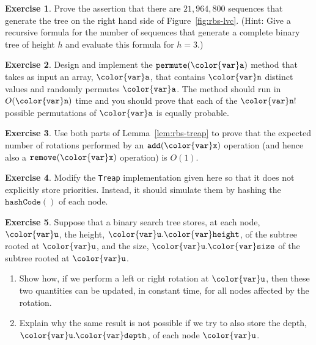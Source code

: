 \documentclass[10pt]{book}
\newcommand{\figref}[1]{Figure~\ref{fig:#1}}
\theoremstyle{plain}
\newcommand{\lemref}[1]{Lemma~\ref{lem:#1}}
\theoremstyle{definition}
\newtheorem{exc}{Exercise}[chapter]
\newcommand{\exclabel}[1]{\label{exc:#1}}
\begin{document}
\begin{exc}
  Prove the assertion that there are $21,964,800$ sequences that generate
  the tree on the right hand side of \figref{rbs-lvc}.  (Hint: Give a
  recursive formula for the number of sequences that generate a complete
  binary tree of height $h$ and evaluate this formula for $h=3$.)
\end{exc}

\begin{exc}
  Design and implement the \ensuremath{\mathtt{permute({\color{var}a})}} method that takes as input an
  array, \ensuremath{\mathtt{{\color{var}a}}}, that contains \ensuremath{\mathtt{{\color{var}n}}} distinct values and randomly permutes \ensuremath{\mathtt{{\color{var}a}}}.
  The method should run in $O(\ensuremath{\mathtt{{\color{var}n}}})$ time and you should prove that each
  of the $\ensuremath{\mathtt{{\color{var}n}}}!$ possible permutations of \ensuremath{\mathtt{{\color{var}a}}} is equally probable. 
\end{exc}

\begin{exc}\exclabel{treap-rotates}
  Use both parts of \lemref{rbs-treap} to prove that the expected number
  of rotations performed by an \ensuremath{\mathtt{add({\color{var}x})}} operation (and hence also a
  \ensuremath{\mathtt{remove({\color{var}x})}} operation) is $O(1)$.
\end{exc}

\begin{exc}
  Modify the \texttt{Treap} implementation given here so that it does not
  explicitly store priorities.  Instead, it should simulate them by
  hashing the \ensuremath{\mathtt{hashCode()}} of each node.
\end{exc}

\begin{exc}
  Suppose that a binary search tree stores, at each node, \ensuremath{\mathtt{{\color{var}u}}}, the height,
  \ensuremath{\mathtt{{\color{var}u}.{\color{var}height}}}, of the subtree rooted at \ensuremath{\mathtt{{\color{var}u}}}, and the size, \ensuremath{\mathtt{{\color{var}u}.{\color{var}size}}} of
  the subtree rooted at \ensuremath{\mathtt{{\color{var}u}}}. 
  \begin{enumerate}
    \item Show how, if we perform a left or right
      rotation at \ensuremath{\mathtt{{\color{var}u}}}, then these two quantities can be updated, in
      constant time, for all nodes affected by the rotation.
    \item Explain why the same result is not possible if we try to
      also store the depth, \ensuremath{\mathtt{{\color{var}u}.{\color{var}depth}}}, of each node \ensuremath{\mathtt{{\color{var}u}}}.
  \end{enumerate}
\end{exc}
\end{document}
